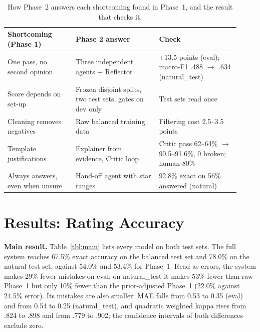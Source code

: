 \documentclass[runningheads]{llncs}
\begin{document}
\begin{table}[t]
\centering
\caption{How Phase~2 answers each shortcoming found in Phase~1, and the result that checks it.}
\label{tbl:solves}
\small
\begin{tabular}{p{0.27\linewidth}p{0.33\linewidth}p{0.32\linewidth}}
\toprule
Shortcoming (Phase 1) & Phase 2 answer & Check \\
\midrule
One pass, no second opinion & Three independent agents + Reflector & +13.5 points (eval); macro-F1 .488 $\to$ .634 (natural\_test) \\
Score depends on set-up & Frozen disjoint splits, two test sets, gates on dev only & Test sets read once \\
Cleaning removes negatives & Raw balanced training data & Filtering cost 2.5--3.5 points \\
Template justifications & Explainer from evidence, Critic loop & Critic pass 62--64\% $\to$ 90.5--91.6\%, 0 broken; human 80\% \\
Always answers, even when unsure & Hand-off agent with star ranges & 92.8\% exact on 56\% answered (natural) \\
\bottomrule
\end{tabular}
\end{table}

\section{Results: Rating Accuracy}
\label{sec:results}

\textbf{Main result.} Table~\ref{tbl:main} lists every model on both test sets. The full system reaches 67.5\% exact accuracy on the balanced test set and 78.0\% on the natural test set, against 54.0\% and 53.4\% for Phase~1. Read as errors, the system makes 29\% fewer mistakes on eval; on natural\_test it makes 53\% fewer than raw Phase~1 but only 10\% fewer than the prior-adjusted Phase~1 (22.0\% against 24.5\% error). Its mistakes are also smaller: MAE falls from 0.53 to 0.35 (eval) and from 0.54 to 0.25 (natural\_test), and quadratic weighted kappa rises from .824 to .898 and from .779 to .902; the confidence intervals of both differences exclude zero.
\end{document}
